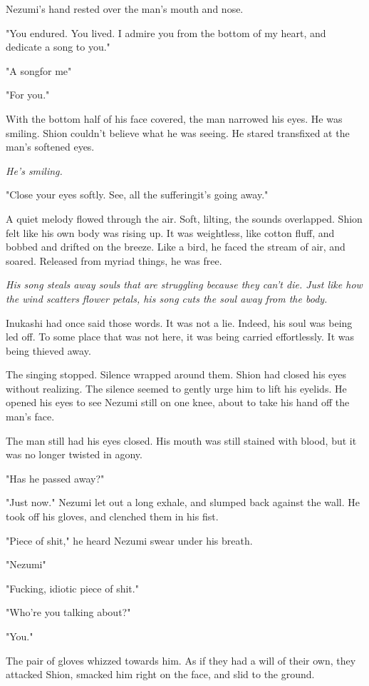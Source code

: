 Nezumi's hand rested over the man's mouth and nose.

"You endured. You lived. I admire you from the bottom of my heart, and
dedicate a song to you."

"A song\el for me\el "

"For you."

With the bottom half of his face covered, the man narrowed his eyes. He
was smiling. Shion couldn't believe what he was seeing. He stared
transfixed at the man's softened eyes.

\emph{He's smiling.}

"Close your eyes softly. See, all the suffering\el it's going away."

A quiet melody flowed through the air. Soft, lilting, the sounds
overlapped. Shion felt like his own body was rising up. It was
weightless, like cotton fluff, and bobbed and drifted on the breeze.
Like a bird, he faced the stream of air, and soared. Released from
myriad things, he was free.

\emph{His song steals away souls that are struggling because they can't die.
Just like how the wind scatters flower petals, his song cuts the soul
away from the body.}

Inukashi had once said those words. It was not a lie. Indeed, his soul
was being led off. To some place that was not here, it was being carried
effortlessly. It was being thieved away.

\mybreak

The singing stopped. Silence wrapped around them. Shion had closed his
eyes without realizing. The silence seemed to gently urge him to lift
his eyelids. He opened his eyes to see Nezumi still on one knee, about
to take his hand off the man's face.

The man still had his eyes closed. His mouth was still stained with
blood, but it was no longer twisted in agony.

"Has he passed away?"

"Just now." Nezumi let out a long exhale, and slumped back against the
wall. He took off his gloves, and clenched them in his fist.

"Piece of shit," he heard Nezumi swear under his breath.

"Nezumi\el "

"Fucking, idiotic piece of shit."

"Who're you talking about?"

"You."

The pair of gloves whizzed towards him. As if they had a will of their
own, they attacked Shion, smacked him right on the face, and slid to the
ground.

